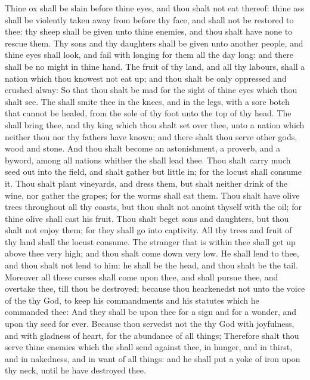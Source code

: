 \begin{biblechapter}
\verse Thine ox shall be slain before thine eyes, and thou shalt not eat thereof: thine ass shall be violently taken away from before thy face, and shall not be restored to thee: thy sheep shall be given unto thine enemies, and thou shalt have none to rescue them.
\verse Thy sons and thy daughters shall be given unto another people, and thine eyes shall look, and fail with longing for them all the day long: and there shall be no might in thine hand.
\verse The fruit of thy land, and all thy labours, shall a nation which thou knowest not eat up; and thou shalt be only oppressed and crushed alway:
\verse So that thou shalt be mad for the sight of thine eyes which thou shalt see.
\verse The \LORD shall smite thee in the knees, and in the legs, with a sore botch that cannot be healed, from the sole of thy foot unto the top of thy head.
\verse The \LORD shall bring thee, and thy king which thou shalt set over thee, unto a nation which neither thou nor thy fathers have known; and there shalt thou serve other gods, wood and stone.
\verse And thou shalt become an astonishment, a proverb, and a byword, among all nations whither the \LORD shall lead thee.
\verse Thou shalt carry much seed out into the field, and shalt gather but little in; for the locust shall consume it.
\verse Thou shalt plant vineyards, and dress them, but shalt neither drink of the wine, nor gather the grapes; for the worms shall eat them.
\verse Thou shalt have olive trees throughout all thy coasts, but thou shalt not anoint thyself with the oil; for thine olive shall cast his fruit.
\verse Thou shalt beget sons and daughters, but thou shalt not enjoy them; for they shall go into captivity.
\verse All thy trees and fruit of thy land shall the locust consume.
\verse The stranger that is within thee shall get up above thee very high; and thou shalt come down very low.
\verse He shall lend to thee, and thou shalt not lend to him: he shall be the head, and thou shalt be the tail.
\verse Moreover all these curses shall come upon thee, and shall pursue thee, and overtake thee, till thou be destroyed; because thou hearkenedst not unto the voice of the \LORD thy God, to keep his commandments and his statutes which he commanded thee:
\verse And they shall be upon thee for a sign and for a wonder, and upon thy seed for ever.
\verse Because thou servedst not the \LORD thy God with joyfulness, and with gladness of heart, for the abundance of all things;
\verse Therefore shalt thou serve thine enemies which the \LORD shall send against thee, in hunger, and in thirst, and in nakedness, and in want of all things: and he shall put a yoke of iron upon thy neck, until he have destroyed thee.

\end{biblechapter}
